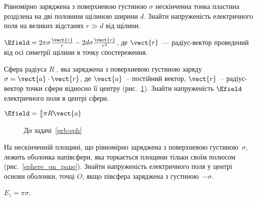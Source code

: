 \begin{problem}
    Рівномірно заряджена з поверхневою густиною $\sigma$ нескінченна тонка пластина розділена на дві половини щілиною ширини $d$. Знайти напруженість електричного поля на великих відстанях $r \gg d$ від щілини.
\begin{solution}
	$\Efield = 2\pi\sigma\frac{\vect{r}}{r} - 2d\sigma\frac{\vect{r}}{r^2}$, де $\vect{r}$~--- радіус-вектор проведений від осі симетрії щілини в точку спостереження.
\end{solution}
\end{problem}


\begin{problem}\label{prb:sph}
Сфера радіуса $R$ , яка заряджена з поверхневою густиною заряду $\sigma = \vect{a}\cdot\vect{r}$, де $\vect{a}$~-- постійний вектор, $\vect{r}$~-- радіус-вектор точки сфери відносно її центру (рис.~\ref{sph}). Знайти напруженість $\Efield$ електричного поля в центрі сфери.
\begin{solution}
	$\Efield = \frac43 \pi R \vect{a}$
\end{solution}
\end{problem}
\begin{figure}[h!]\centering
	\caption{До задачі~\ref{prb:sph}}
	\label{sph}
\end{figure}

\begin{problem}\label{prb:sphere_on_pane}
На нескінченній площині, що рівномірно заряджена з поверхневою густиною~$\sigma$, лежить оболонка напівсфери, яка торкається площини тільки своїм полюсом (рис.~\ref{sphere_on_pane}). Знайти напруженість електричного поля у центрі основи оболонки, точці $O$, якщо півсфера заряджена з густиною~$-\sigma$.
\begin{solution}
	$E_z = \pi\sigma$.
\end{solution}
\end{problem}

